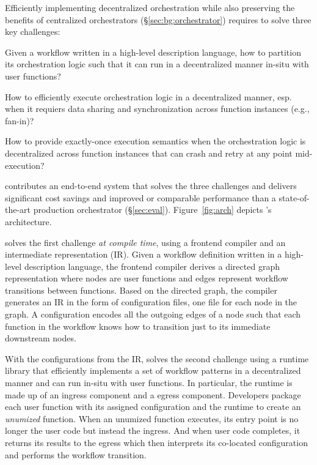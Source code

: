Efficiently implementing decentralized orchestration while also preserving the
benefits of centralized orchestrators (\S\ref{sec:bg:orchestrator}) requires
\name{} to solve three key challenges:

\squishenum
	\item Given a workflow written in a high-level description language, how
	to partition its orchestration logic such that it can run in a
	decentralized manner in-situ with user functions?

	\item How to efficiently execute orchestration logic in a
	decentralized manner, esp. when it requiers data sharing and
	synchronization across function instances (e.g., fan-in)?

	\item How to provide exactly-once execution semantics when the
	orchestration logic is decentralized across function instances that can
	crash and retry at any point mid-execution?
\squishenumend

\name{} contributes an end-to-end system that solves the three challenges and
delivers significant cost savings and improved or comparable performance than
a state-of-the-art production orchestrator (\S\ref{sec:eval}).
Figure~\ref{fig:arch} depicts
\name{}'s architecture.  

\name{} solves the first challenge \emph{at compile time}, using a frontend
compiler and an intermediate representation (IR). Given a workflow definition
written in a high-level description language, the frontend compiler derives a
directed graph representation where nodes are user functions and edges
represent workflow transitions between functions. Based on the directed graph,
the compiler generates an IR in the form of configuration files, one file for
each node in the graph. A \name{} configuration encodes all the outgoing edges
of a node such that each function in the workflow knows how to transition just
to its immediate downstream nodes.

With the configurations from the IR, \name{} solves the second challenge using
a runtime library that efficiently implements a set of workflow patterns in a
decentralized manner and can run in-situ with user functions. In particular,
the \name{} runtime is made up of an ingress component and a egress component.
Developers package each user function with its assigned \name{} configuration
and the \name{} runtime to create an \emph{unumized} function. When an
unumized function executes, its entry point is no longer the user code but
instead the \name{} ingress. And when user code completes, it returns its
results to the \name{} egress which then interprets its co-located \name{}
configuration and performs the workflow transition.

